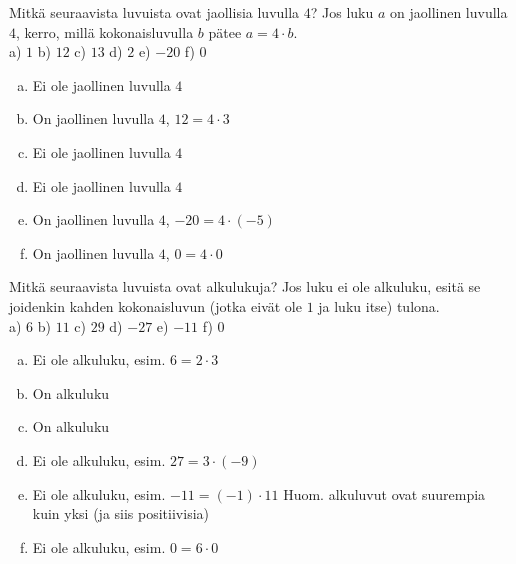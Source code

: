     \begin{tehtava}
    Mitkä seuraavista luvuista ovat jaollisia luvulla $4$? Jos luku $a$ on jaollinen luvulla $4$, kerro, millä kokonaisluvulla $b$ pätee $a = 4 \cdot b$.\\
    a) $1$ \quad b) $12$  \quad c) $13$ \quad d) $2$ \quad e) $-20$ \quad f) $0$
    
    \begin{vastaus}
    \begin{enumerate}[a)]
        \item Ei ole jaollinen luvulla $4$
      \item On jaollinen luvulla $4$, $12 = 4 \cdot 3$
      \item Ei ole jaollinen luvulla $4$
      \item Ei ole jaollinen luvulla $4$
      \item On jaollinen luvulla $4$, $-20 = 4 \cdot (-5)$
      \item On jaollinen luvulla $4$, $0 = 4 \cdot 0$ 
    \end{enumerate}
    \end{vastaus}
    \end{tehtava}
    
    \begin{tehtava}
      Mitkä seuraavista luvuista ovat alkulukuja? Jos luku ei ole alkuluku, esitä se joidenkin kahden kokonaisluvun (jotka eivät ole $1$ ja luku itse) tulona.\\
    a) $6$ \quad b) $11$ \quad c) $29$ \quad d) $-27$ \quad e) $-11$ \quad f) $0$ 
    
    \begin{vastaus}
    \begin{enumerate}[a)]
    	\item Ei ole alkuluku, esim. $6 = 2 \cdot 3$
    	\item On alkuluku
    	\item On alkuluku
    	\item Ei ole alkuluku, esim. $27 = 3 \cdot (-9)$
    	\item Ei ole alkuluku, esim. $-11 = (-1) \cdot 11$ Huom. alkuluvut ovat suurempia kuin yksi (ja siis positiivisia)
    	\item Ei ole alkuluku, esim. $0 = 6 \cdot 0$
    \end{enumerate}
    \end{vastaus}
    \end{tehtava}
    
